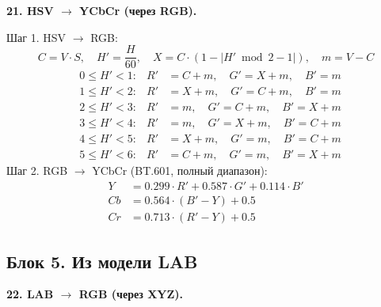 \documentclass[12pt,a4paper]{article}
\begin{document}
\textbf{21. HSV \(\to\) YCbCr (через RGB).}

Шаг 1. HSV \(\to\) RGB:
\[
C = V \cdot S,\quad H' = \frac{H}{60},\quad X = C \cdot (1 - |H' \bmod 2 - 1|),\quad m = V - C
\]
\begin{align*}
&0 \le H' < 1: & R' &= C + m,\quad G' = X + m,\quad B' = m \\
&1 \le H' < 2: & R' &= X + m,\quad G' = C + m,\quad B' = m \\
&2 \le H' < 3: & R' &= m,\quad G' = C + m,\quad B' = X + m \\
&3 \le H' < 4: & R' &= m,\quad G' = X + m,\quad B' = C + m \\
&4 \le H' < 5: & R' &= X + m,\quad G' = m,\quad B' = C + m \\
&5 \le H' < 6: & R' &= C + m,\quad G' = m,\quad B' = X + m
\end{align*}
Шаг 2. RGB \(\to\) YCbCr (BT.601, полный диапазон):
\begin{align*}
Y &= 0.299 \cdot R' + 0.587 \cdot G' + 0.114 \cdot B' \\
Cb &= 0.564 \cdot (B' - Y) + 0.5 \\
Cr &= 0.713 \cdot (R' - Y) + 0.5
\end{align*}

\subsection{Блок 5. Из модели LAB}

\textbf{22. LAB \(\to\) RGB (через XYZ).}
\end{document}
